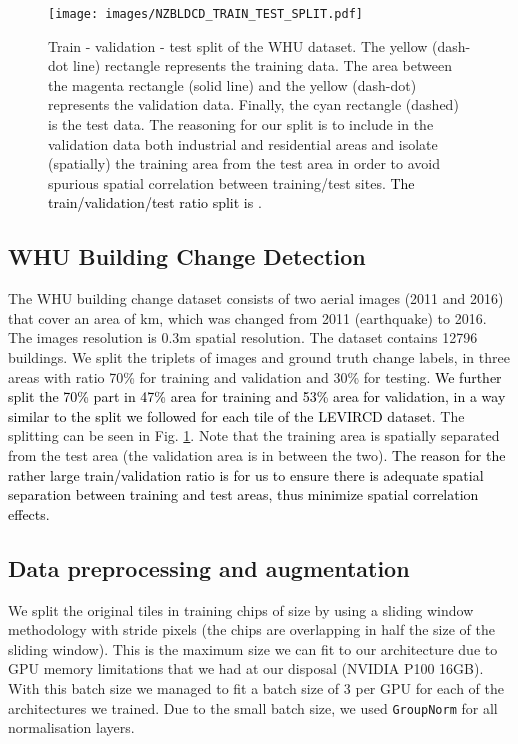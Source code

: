 \documentclass[times, 5p]{elsarticle}
\begin{document}
 
\begin{figure}
\centering
\texttt{[image: images/NZBLDCD\_TRAIN\_TEST\_SPLIT.pdf]}
\caption{Train - validation - test split of the WHU dataset. The yellow (dash-dot line) rectangle represents the training data. The area between the magenta rectangle (solid line) and the yellow (dash-dot) represents the validation data. Finally, the cyan rectangle (dashed) is the test data. The reasoning for our split is to include in the validation data both industrial and residential areas and isolate (spatially) the training area from the test area in order to avoid spurious spatial correlation between training/test sites. \textcolor{black}{The train/validation/test ratio split is }.} 
\label{NZBLDGCD_TRAIN_TEST_SPLIT}
\end{figure}




\subsection{WHU Building Change Detection}


The WHU building change dataset \citep{Ji2019FullyCN} consists of two  aerial images (2011 and 2016) that 
 cover an area of km, which was changed from 2011 (earthquake) to 2016.
 The images resolution is 0.3m spatial resolution. The dataset contains 12796 buildings. We split the triplets of images and ground truth change labels, in three areas with ratio 70\% for training and validation and 30\% for testing. 
 \textcolor{black}{We further split the 70\% part in 47\% area for training and 53\% area for validation, in a way similar to the split we followed for each tile of the LEVIRCD dataset}. 
The splitting can be seen in Fig. \ref{NZBLDGCD_TRAIN_TEST_SPLIT}. 
Note that the training area is spatially separated from the test area (the validation area is in between the two). \textcolor{black}{The reason for the rather large train/validation ratio is for us to ensure there is adequate spatial separation between training and test areas, thus minimize spatial correlation effects.}








\subsection{Data preprocessing and augmentation}

We split the original tiles in training chips of size  by using a sliding window methodology with stride  pixels (the chips are overlapping in half the size of the sliding window). This is the maximum size we can fit to our architecture due to GPU memory limitations that we had at our disposal (NVIDIA P100 16GB). With this batch size we managed to fit a batch size of 3 per GPU for each of the architectures we trained. Due to the small batch size, we used \texttt{GroupNorm} \citep{DBLP:journals/corr/abs-1803-08494} for all normalisation layers. 
\end{document}

